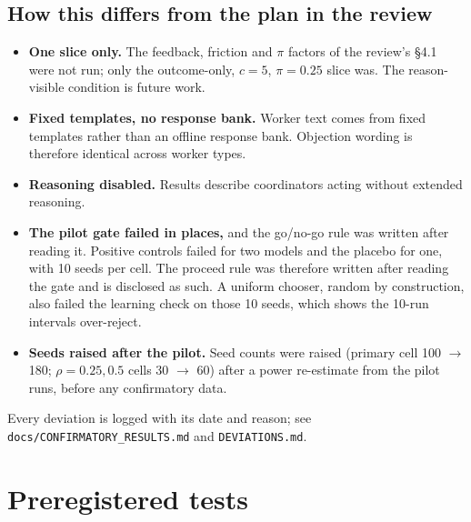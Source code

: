 \documentclass[11pt,a4paper]{article}
\begin{document}
\subsection{How this differs from the plan in the review}

\begin{itemize}
  \item \textbf{One slice only.} The feedback, friction and $\pi$ factors of the review's \S4.1 were not run; only the outcome-only, $c=5$, $\pi=0.25$ slice was. The reason-visible condition is future work.
  \item \textbf{Fixed templates, no response bank.} Worker text comes from fixed templates rather than an offline response bank. Objection wording is therefore identical across worker types.
  \item \textbf{Reasoning disabled.} Results describe coordinators acting without extended reasoning.
  \item \textbf{The pilot gate failed in places,} and the go/no-go rule was written after reading it. Positive controls failed for two models and the placebo for one, with 10 seeds per cell. The proceed rule was therefore written after reading the gate and is disclosed as such. A uniform chooser, random by construction, also failed the learning check on those 10 seeds, which shows the 10-run intervals over-reject.
  \item \textbf{Seeds raised after the pilot.} Seed counts were raised (primary cell 100 $\to$ 180; $\rho=0.25, 0.5$ cells 30 $\to$ 60) after a power re-estimate from the pilot runs, before any confirmatory data.
\end{itemize}
\noindent Every deviation is logged with its date and reason; see \texttt{docs/CONFIRMATORY\_RESULTS.md} and \texttt{DEVIATIONS.md}.

\section{Preregistered tests}
\end{document}
